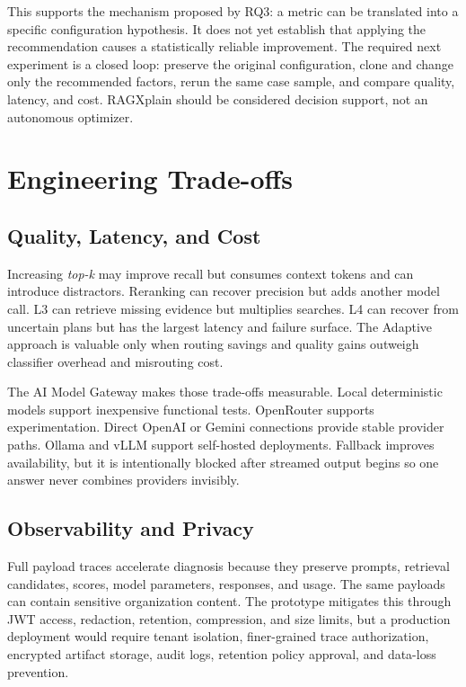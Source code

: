 This supports the mechanism proposed by RQ3: a metric can be translated into a
specific configuration hypothesis. It does not yet establish that applying the
recommendation causes a statistically reliable improvement. The required next
experiment is a closed loop: preserve the original configuration, clone and
change only the recommended factors, rerun the same case sample, and compare
quality, latency, and cost. RAGXplain should be considered decision support,
not an autonomous optimizer.

\section{Engineering Trade-offs}

\subsection{Quality, Latency, and Cost}

Increasing \textit{top-k} may improve recall but consumes context tokens and can
introduce distractors. Reranking can recover precision but adds another model
call. L3 can retrieve missing evidence but multiplies searches. L4 can recover
from uncertain plans but has the largest latency and failure surface. The
Adaptive approach is valuable only when routing savings and quality gains
outweigh classifier overhead and misrouting cost.

The AI Model Gateway makes those trade-offs measurable. Local deterministic
models support inexpensive functional tests. OpenRouter supports
experimentation. Direct OpenAI or Gemini connections provide stable provider
paths. Ollama and vLLM support self-hosted deployments. Fallback improves
availability, but it is intentionally blocked after streamed output begins so
one answer never combines providers invisibly.

\subsection{Observability and Privacy}

Full payload traces accelerate diagnosis because they preserve prompts,
retrieval candidates, scores, model parameters, responses, and usage. The same
payloads can contain sensitive organization content. The prototype mitigates
this through JWT access, redaction, retention, compression, and size limits,
but a production deployment would require tenant isolation, finer-grained trace
authorization, encrypted artifact storage, audit logs, retention policy
approval, and data-loss prevention.

